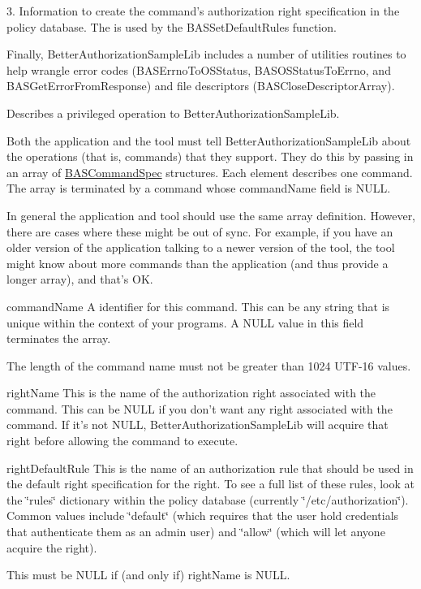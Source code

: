 3. Information to create the command's authorization right specification in the policy database. The is used by the BASSetDefaultRules function.

Finally, BetterAuthorizationSampleLib includes a number of utilities routines to help wrangle error codes (BASErrnoToOSStatus, BASOSStatusToErrno, and BASGetErrorFromResponse) and file descriptors (BASCloseDescriptorArray).

Describes a privileged operation to BetterAuthorizationSampleLib.

Both the application and the tool must tell BetterAuthorizationSampleLib about the operations (that is, commands) that they support. They do this by passing in an array of \hyperlink{struct_b_a_s_command_spec}{BASCommandSpec} structures. Each element describes one command. The array is terminated by a command whose commandName field is NULL.

In general the application and tool should use the same array definition. However, there are cases where these might be out of sync. For example, if you have an older version of the application talking to a newer version of the tool, the tool might know about more commands than the application (and thus provide a longer array), and that's OK.

commandName A identifier for this command. This can be any string that is unique within the context of your programs. A NULL value in this field terminates the array.

The length of the command name must not be greater than 1024 UTF-16 values.

rightName This is the name of the authorization right associated with the command. This can be NULL if you don't want any right associated with the command. If it's not NULL, BetterAuthorizationSampleLib will acquire that right before allowing the command to execute.

rightDefaultRule This is the name of an authorization rule that should be used in the default right specification for the right. To see a full list of these rules, look at the \char`\"{}rules\char`\"{} dictionary within the policy database (currently \char`\"{}/etc/authorization\char`\"{}). Common values include \char`\"{}default\char`\"{} (which requires that the user hold credentials that authenticate them as an admin user) and \char`\"{}allow\char`\"{} (which will let anyone acquire the right).

This must be NULL if (and only if) rightName is NULL.

